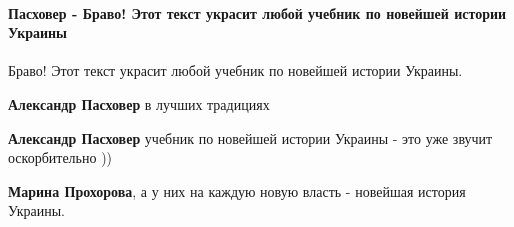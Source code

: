  
 
 
 
 
\paragraph{Пасховер - Браво! Этот текст украсит любой учебник по новейшей истории Украины}

\begin{itemize}
 
Браво! Этот текст украсит любой учебник по новейшей истории Украины.

\begin{itemize}
 
\textbf{Александр Пасховер} в лучших традициях

 
\textbf{Александр Пасховер} учебник по новейшей истории Украины - это уже звучит оскорбительно ))

 
\textbf{Марина Прохорова}, а у них на каждую новую власть - новейшая история Украины.

 

\end{itemize}
\end{itemize}
